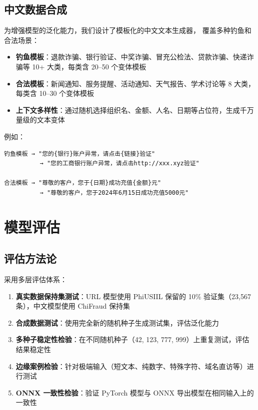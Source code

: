 \documentclass[11pt,a4paper]{article}
\begin{document}
\subsection{中文数据合成}

为增强模型的泛化能力，我们设计了模板化的中文文本生成器，
覆盖多种钓鱼和合法场景：

\begin{itemize}
  \item \textbf{钓鱼模板}：退款诈骗、银行验证、中奖诈骗、冒充公检法、贷款诈骗、快递诈骗等 10+ 大类，每类含 20--50 个变体模板
  \item \textbf{合法模板}：新闻通知、服务提醒、活动通知、天气报告、学术讨论等 8 大类，每类含 10--30 个变体模板
  \item \textbf{上下文多样性}：通过随机选择组织名、金额、人名、日期等占位符，生成千万量级的文本变体
\end{itemize}

例如：
\begin{Verbatim}[frame=single,fontsize=\small]
钓鱼模板 → "您的{银行}账户异常，请点击{链接}验证"
          → "您的工商银行账户异常，请点击http://xxx.xyz验证"

合法模板 → "尊敬的客户，您于{日期}成功充值{金额}元"
          → "尊敬的客户，您于2024年6月15日成功充值5000元"
\end{Verbatim}

\section{模型评估}

\subsection{评估方法论}

采用多层评估体系：
\begin{enumerate}
  \item \textbf{真实数据保持集测试}：URL 模型使用 PhiUSIIL 保留的 10\% 验证集（23,567 条），中文模型使用 ChiFraud 保持集
  \item \textbf{合成数据测试}：使用完全新的随机种子生成测试集，评估泛化能力
  \item \textbf{多种子稳定性检验}：在不同随机种子（42, 123, 777, 999）上重复测试，评估结果稳定性
  \item \textbf{边缘案例检验}：针对极端输入（短文本、纯数字、特殊字符、域名直访等）进行测试
  \item \textbf{ONNX 一致性检验}：验证 PyTorch 模型与 ONNX 导出模型在相同输入上的一致性
\end{enumerate}
\end{document}
